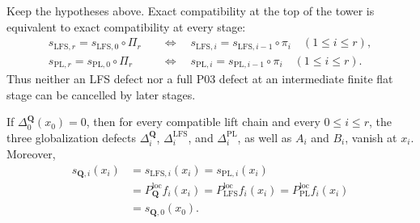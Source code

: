 \begin{corollary}
\label{cor:p031-finite-flat-tower-no-cancellation}
Keep the hypotheses above.  Exact compatibility at the top of the tower is
equivalent to exact compatibility at every stage:
\begin{align}
 s_{\mathrm{LFS},r}=s_{\mathrm{LFS},0}\circ\Pi_r
 &\quad\Longleftrightarrow\quad
 s_{\mathrm{LFS},i}=s_{\mathrm{LFS},i-1}\circ\pi_i
 \quad(1\leq i\leq r),
\label{eq:p031-tower-lfs-no-cancellation}\\
 s_{\mathrm{PL},r}=s_{\mathrm{PL},0}\circ\Pi_r
 &\quad\Longleftrightarrow\quad
 s_{\mathrm{PL},i}=s_{\mathrm{PL},i-1}\circ\pi_i
 \quad(1\leq i\leq r).
\label{eq:p031-tower-pl-no-cancellation}
\end{align}
Thus neither an LFS defect nor a full P03 defect at an intermediate finite
flat stage can be cancelled by later stages.
\end{corollary}

\begin{corollary}
\label{cor:p031-rational-cofinality-tower-collapse}
If $\Delta_0^{\mathbf Q}(x_0)=0$, then for every compatible lift chain and
every $0\leq i\leq r$, the three globalization defects
$\Delta_i^{\mathbf Q}$, $\Delta_i^{\mathrm{LFS}}$, and
$\Delta_i^{\mathrm{PL}}$, as well as $A_i$ and $B_i$, vanish at $x_i$.
Moreover,
\begin{equation}
\label{eq:p031-rational-cofinality-tower-collapse}
 \begin{split}
 s_{\mathbf Q,i}(x_i)
  &=s_{\mathrm{LFS},i}(x_i)=s_{\mathrm{PL},i}(x_i)\\
  &=P_{\mathbf Q}^{\mathrm{loc}}f_i(x_i)
    =P_{\mathrm{LFS}}^{\mathrm{loc}}f_i(x_i)
    =P_{\mathrm{PL}}^{\mathrm{loc}}f_i(x_i)\\
  &=s_{\mathbf Q,0}(x_0).
 \end{split}
\end{equation}
\end{corollary}
